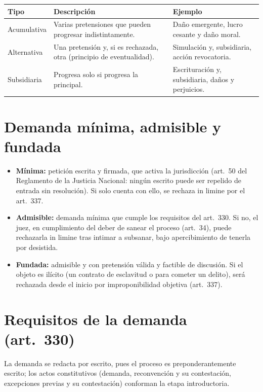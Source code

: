 \documentclass[12pt,oneside]{book}
\renewcommand{\arraystretch}{1.15}
\begin{document}
\begin{table}[H]
\centering
\renewcommand{\arraystretch}{1.2}
\begin{tabularx}{\textwidth}{>{\RaggedRight\arraybackslash}p{}>{\RaggedRight\arraybackslash}X>{\RaggedRight\arraybackslash}X}
\toprule
\textbf{Tipo} & \textbf{Descripción} & \textbf{Ejemplo} \\
\midrule
Acumulativa & Varias pretensiones que pueden progresar indistintamente. & Daño emergente, lucro cesante y daño moral. \\
Alternativa & Una pretensión y, si es rechazada, otra (principio de eventualidad). & Simulación y, subsidiaria, acción revocatoria. \\
Subsidiaria & Progresa solo si progresa la principal. & Escrituración y, subsidiaria, daños y perjuicios. \\
\bottomrule
\end{tabularx}
\end{table}

\section{Demanda mínima, admisible y fundada}

\begin{itemize}
\item \textbf{Mínima:} petición escrita y firmada, que activa la jurisdicción (art.~50 del Reglamento de la Justicia Nacional: ningún escrito puede ser repelido de entrada sin resolución). Si solo cuenta con ello, se rechaza in limine por el art.~337.
\item \textbf{Admisible:} demanda mínima que cumple los requisitos del art.~330. Si no, el juez, en cumplimiento del deber de sanear el proceso (art.~34), puede rechazarla in limine tras intimar a subsanar, bajo apercibimiento de tenerla por desistida.
\item \textbf{Fundada:} admisible y con pretensión válida y factible de discusión. Si el objeto es ilícito (un contrato de esclavitud o para cometer un delito), será rechazada desde el inicio por improponibilidad objetiva (art.~337).
\end{itemize}

\section{Requisitos de la demanda (art.~330)}

La demanda se redacta por escrito, pues el proceso es preponderantemente escrito; los actos constitutivos (demanda, reconvención y su contestación, excepciones previas y su contestación) conforman la etapa introductoria.
\end{document}
